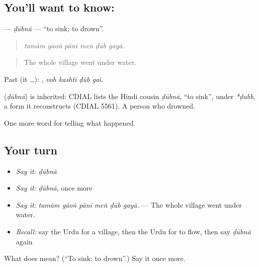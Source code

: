\subsection*{You'll want to know: }
\textbf{} — \emph{ḍūbnā} — \textquotedblleft{}to sink; to drown\textquotedblright{}.

\begin{quote}
     
\end{quote}

\begin{quote}
\emph{tamām gāoṅ pānī meṅ ḍūb gayā.}
\end{quote}

\begin{quote}
The whole village went under water.
\end{quote}

Past (it …):    , \emph{voh kashtī ḍūb gaī}.

\begin{cousinweb}
\textbf{} (\emph{ḍūbnā}) is inherited: CDIAL lists the Hindi cousin \emph{ḍūbnā}, \textquotedblleft{}to sink\textquotedblright{}, under \emph{*ḍubb}, a form it reconstructs (CDIAL 5561). A person who \textbf{ } drowned.
\end{cousinweb}

\begin{grammarlens}[title={What you've built}]
One more word for telling what happened.
\end{grammarlens}

\subsection*{Your turn}
\begin{itemize}
\raggedright
  \item \emph{Say it:} \emph{ḍūbnā}
  \item \emph{Say it:} \emph{ḍūbnā}, once more
  \item \emph{Say it:} \emph{tamām gāoṅ pānī meṅ ḍūb gayā.} — The whole village went under water.
  \item \emph{Recall:} say the Urdu for a village, then the Urdu for to flow, then say \emph{ḍūbnā} again
\end{itemize}

\begin{tcolorbox}[breakable,colback=teal!4,colframe=teal!35!black,title={Before you move on}]
What does  mean? (\textquotedblleft{}To sink; to drown\textquotedblright{}.) Say it once more.
\end{tcolorbox}
